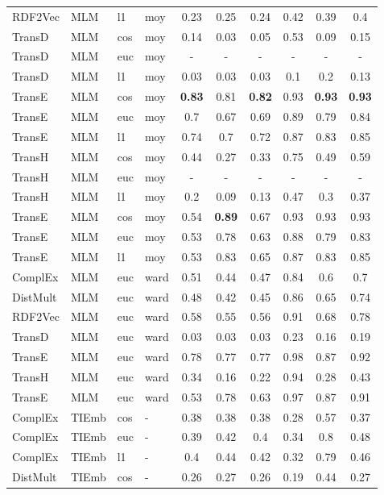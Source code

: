 \begin{longtable}{|llll|ccc|ccc|}
RDF2Vec	&	MLM	&	l1	&	moy	&	0.23	&	0.25	&	0.24	&	0.42	&	0.39	&	0.4 \\ 
TransD	&	MLM	&	cos	&	moy	&	0.14	&	0.03	&	0.05	&	0.53	&	0.09	&	0.15 \\ 
TransD	&	MLM	&	euc	&	moy	&	-	&	-	&	-	&	-	&	-	&	-\\
TransD	&	MLM	&	l1	&	moy	&	0.03	&	0.03	&	0.03	&	0.1	&	0.2	&	0.13 \\ 
TransE	&	MLM	&	cos	&	moy	&	\textbf{0.83}	&	0.81	&	\textbf{0.82}	&	0.93	&	\textbf{0.93}	&	\textbf{0.93} \\ 
TransE	&	MLM	&	euc	&	moy	&	0.7	&	0.67	&	0.69	&	0.89	&	0.79	&	0.84 \\ 
TransE	&	MLM	&	l1	&	moy	&	0.74	&	0.7	&	0.72	&	0.87	&	0.83	&	0.85 \\ 
TransH	&	MLM	&	cos	&	moy	&	0.44	&	0.27	&	0.33	&	0.75	&	0.49	&	0.59 \\ 
TransH	&	MLM	&	euc	&	moy	&	-	&	-	&	-	&	-	&	-	&	- \\ 
TransH	&	MLM	&	l1	&	moy	&	0.2	&	0.09	&	0.13	&	0.47	&	0.3	&	0.37 \\ 
TransE	&	MLM	&	cos	&	moy	&	0.54	&	\textbf{0.89}	&	0.67	&	0.93	&	0.93	&	0.93 \\ 
TransE	&	MLM	&	euc	&	moy	&	0.53	&	0.78	&	0.63	&	0.88	&	0.79	&	0.83 \\ 
TransE	&	MLM	&	l1	&	moy	&	0.53	&	0.83	&	0.65	&	0.87	&	0.83	&	0.85 \\ 
ComplEx	&	MLM	&	euc	&	ward	&	0.51	&	0.44	&	0.47	&	0.84	&	0.6	&	0.7 \\ 
DistMult	&	MLM	&	euc	&	ward	&	0.48	&	0.42	&	0.45	&	0.86	&	0.65	&	0.74 \\ 
RDF2Vec	&	MLM	&	euc	&	ward	&	0.58	&	0.55	&	0.56	&	0.91	&	0.68	&	0.78 \\ 
TransD	&	MLM	&	euc	&	ward	&	0.03	&	0.03	&	0.03	&	0.23	&	0.16	&	0.19 \\ 
TransE	&	MLM	&	euc	&	ward	&	0.78	&	0.77	&	0.77	&	0.98	&	0.87	&	0.92 \\ 
TransH	&	MLM	&	euc	&	ward	&	0.34	&	0.16	&	0.22	&	0.94	&	0.28	&	0.43 \\ 
TransE	&	MLM	&	euc	&	ward	&	0.53	&	0.78	&	0.63	&	0.97	&	0.87	&	0.91 \\ 
\hline 
ComplEx	&	TIEmb	&	cos	&	-	&	0.38	&	0.38	&	0.38	&	0.28	&	0.57	&	0.37 \\ 
ComplEx	&	TIEmb	&	euc	&	-	&	0.39	&	0.42	&	0.4	&	0.34	&	0.8	&	0.48 \\ 
ComplEx	&	TIEmb	&	l1	&	-	&	0.4	&	0.44	&	0.42	&	0.32	&	0.79	&	0.46 \\ 
DistMult	&	TIEmb	&	cos	&	-	&	0.26	&	0.27	&	0.26	&	0.19	&	0.44	&	0.27 \\ 

\end{longtable}
